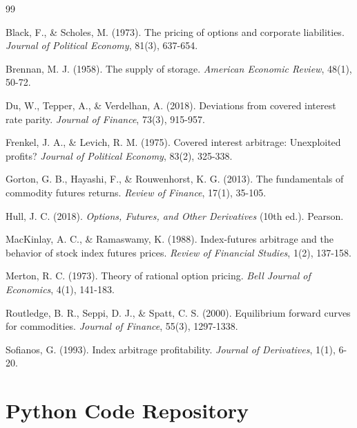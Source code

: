 \documentclass[12pt,a4paper]{article}
\begin{document}
\newpage
\begin{thebibliography}{99}

Black, F., \& Scholes, M. (1973). The pricing of options and corporate liabilities. \textit{Journal of Political Economy}, 81(3), 637-654.

Brennan, M. J. (1958). The supply of storage. \textit{American Economic Review}, 48(1), 50-72.

Du, W., Tepper, A., \& Verdelhan, A. (2018). Deviations from covered interest rate parity. \textit{Journal of Finance}, 73(3), 915-957.

Frenkel, J. A., \& Levich, R. M. (1975). Covered interest arbitrage: Unexploited profits? \textit{Journal of Political Economy}, 83(2), 325-338.

Gorton, G. B., Hayashi, F., \& Rouwenhorst, K. G. (2013). The fundamentals of commodity futures returns. \textit{Review of Finance}, 17(1), 35-105.

Hull, J. C. (2018). \textit{Options, Futures, and Other Derivatives} (10th ed.). Pearson.

MacKinlay, A. C., \& Ramaswamy, K. (1988). Index-futures arbitrage and the behavior of stock index futures prices. \textit{Review of Financial Studies}, 1(2), 137-158.

Merton, R. C. (1973). Theory of rational option pricing. \textit{Bell Journal of Economics}, 4(1), 141-183.

Routledge, B. R., Seppi, D. J., \& Spatt, C. S. (2000). Equilibrium forward curves for commodities. \textit{Journal of Finance}, 55(3), 1297-1338.

Sofianos, G. (1993). Index arbitrage profitability. \textit{Journal of Derivatives}, 1(1), 6-20.

\end{thebibliography}

\newpage
\appendix

\section{Python Code Repository}
\end{document}
